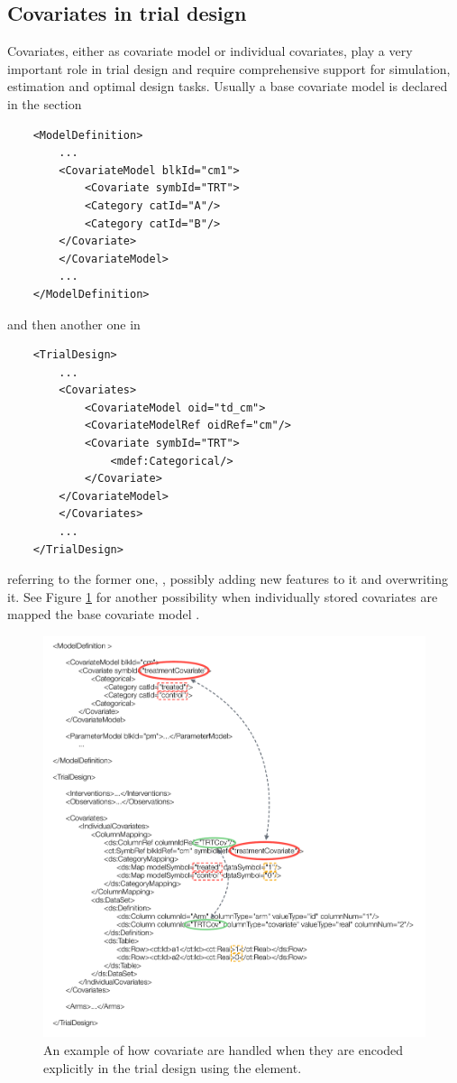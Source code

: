 \subsection{Covariates in trial design}
\label{sec:covModel}
Covariates, either as covariate model or individual covariates, play a very 
important role in trial design and require comprehensive support for simulation, 
estimation and optimal design tasks. 
Usually a base covariate model is declared in the 
section 
\lstset{language=XML}
\begin{lstlisting}
	<ModelDefinition>
	    ...
	    <CovariateModel blkId="cm1">
	        <Covariate symbId="TRT">
		    <Category catId="A"/>
		    <Category catId="B"/>
		</Covariate>
	    </CovariateModel>
	    ...
	</ModelDefinition>
\end{lstlisting}
and then another one in  
\lstset{language=XML}
\begin{lstlisting}
	<TrialDesign>
	    ...
	    <Covariates>
	        <CovariateModel oid="td_cm">
		    <CovariateModelRef oidRef="cm"/>
		    <Covariate symbId="TRT">
		        <mdef:Categorical/>
		    </Covariate>
		</CovariateModel>
	    </Covariates>
	    ...
	</TrialDesign>
\end{lstlisting}
referring to the former one, , possibly adding new features to it and overwriting it.
See Figure \ref{fig:mapIndCov} for another possibility when individually stored covariates 
are mapped the base covariate model	.
	
\begin{figure}[htb]
\centering
  \includegraphics[width=130mm]{pics/Mapping_covariateModels_0_9}
  \caption{An example of how covariate are handled when they are encoded
  explicitly in the trial design using the  element.}
  \label{fig:mapIndCov}
\end{figure}


